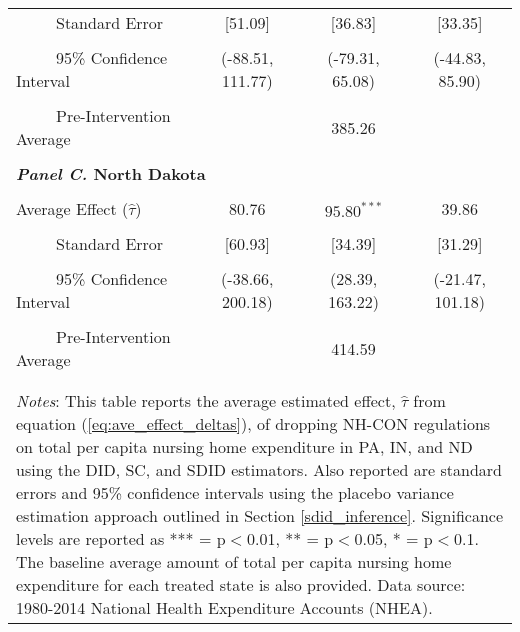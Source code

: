 \documentclass[../Main.tex]{subfiles}
\begin{document}
\begin{table}[htbp]
\begin{tabular}{l*{3}{c}}
\\[-2ex]
\multicolumn{1}{l}{\ \ \ \ \ Standard Error}  &\multicolumn{1}{c}{[51.09]}&\multicolumn{1}{c}{[36.83]}&\multicolumn{1}{c}{[33.35]}\\
\\[-2ex]
\multicolumn{1}{l}{\ \ \ \ \ 95\% Confidence Interval}&   \multicolumn{1}{c}{(-88.51, 111.77)}&   \multicolumn{1}{c}{(-79.31, 65.08)}&   \multicolumn{1}{c}{(-44.83, 85.90)}\\
\\[-2ex]
\multicolumn{1}{l}{\ \ \ \ \ Pre-Intervention Average}&   \multicolumn{3}{c}{385.26}\\
\\[-.1ex]
\multicolumn{4}{l}{\textbf{\textit{Panel C.} North Dakota}}\\
\\[-1.5ex]
\multicolumn{1}{l}{Average Effect ($\hat{\tau}$)}&   \multicolumn{1}{c}{80.76}&   \multicolumn{1}{c}{$95.80^{***}$}&  \multicolumn{1}{c}{39.86}\\
\\[-2ex]
\multicolumn{1}{l}{\ \ \ \ \ Standard Error}  &\multicolumn{1}{c}{[60.93]}&\multicolumn{1}{c}{[34.39]}&\multicolumn{1}{c}{[31.29]}\\
\\[-2ex]
\multicolumn{1}{l}{\ \ \ \ \ 95\% Confidence Interval}&   \multicolumn{1}{c}{(-38.66, 200.18)}&   \multicolumn{1}{c}{(28.39, 163.22)}&   \multicolumn{1}{c}{(-21.47, 101.18)}\\
\\[-2ex]
\multicolumn{1}{l}{\ \ \ \ \ Pre-Intervention Average}&   \multicolumn{3}{c}{414.59}\\
\\[-.1ex]
\hline\hline
\\[-2ex]
\multicolumn{4}{p{.78\linewidth}}{\footnotesize \textit{Notes}: This table reports the average estimated effect, $\hat{\tau}$ from equation (\ref{eq:ave_effect_deltas}), of dropping NH-CON regulations on total per capita nursing home expenditure in PA, IN, and ND using the DID, SC, and SDID estimators. Also reported are standard errors and 95\% confidence intervals using the placebo variance estimation approach outlined in Section \ref{sdid_inference}. Significance levels are reported as *** = p$<$0.01, ** = p$<$0.05, * = p$<$0.1. The baseline average amount of total per capita nursing home expenditure for each treated state is also provided. Data source: 1980-2014 National Health Expenditure Accounts (NHEA).}
\end{tabular}
\end{table}
\vfill
\clearpage
\end{document}
